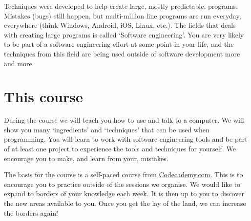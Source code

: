 	Techniques were developed to help create large, mostly predictable, programs.
	Mistakes (bugs) still happen, but multi-million line programs are run everyday, everywhere (think Windows, Android, iOS, Linux, etc.).
	The fields that deals with creating large programs is called `Software engineering'.
	You are very likely to be part of a software engineering effort at some point in your life, and the techniques from this field are being used outside of software development more and more.

	\section{This course}
	
	During the course we will teach you how to use and talk to a computer. 
	We will show you many `ingredients' and `techniques' that can be used when programming.
	You will learn to work with software engineering tools and be part of at least one project to experience the tools and techniques for yourself.
	We encourage you to make, and learn from your, mistakes.
	
	The basis for the course is a self-paced course from \url{Codecademy.com}.
	This is to encourage you to practice outside of the sessions we organise.
	We would like to expand to borders of your knowledge each week.
	It is then up to you to discover the new areas available to you.
	Once you get the lay of the land, we can increase the borders again!